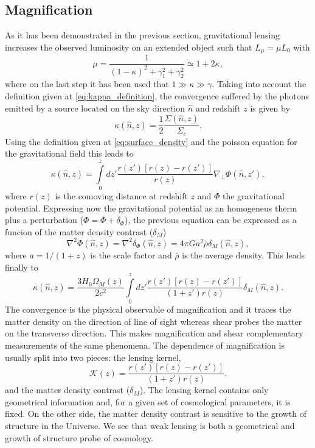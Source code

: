 \subsection{Magnification}
As it has been demonstrated in the previous section, gravitational lensing increases the observed luminosity on an extended object \cite{1989Sci...245..824B,1992RvMA....5..259B,1992LNP...406..345B,1995A&A...303..643B,1995AIPC..336..307B} such that $L_\mu = \mu L_0$ with 
\begin{equation}
\mu = \frac1{(1-\kappa)^2+\gamma_1^2+\gamma_2^2}\simeq 1+2\kappa,
\label{eq:mu_definition}
\end{equation}
where on the last step it has been used that $1\gg\kappa\gg\gamma$. Taking into account the definition given at \autoref{eq:kappa_definition}, the convergence suffered by the photons emitted by a source located on the sky direction $\hat n$ and redshift $z$ is given by
\begin{equation}
\kappa(\hat n,z) = \frac{1}{2}\frac{\Sigma(\hat n,z)}{\Sigma_c}.
\end{equation}
Using the definition given at \autoref{eq:surface_density} and the poisson equation for the gravitational field this leads to
\begin{equation}
\kappa(\hat n,z) = \int\limits_0^zdz'\frac{r(z')[r(z)-r(z')]}{r(z)}\nabla_\perp\Phi(\hat n,z'),
\label{eq:kappaphi}
\end{equation}
where $r(z)$ is the comoving distance at redshift $z$ and $\Phi$ the gravitational potential. Expressing now the gravitational potential as an homogeneus therm plus a perturbation ($\Phi = \bar\Phi+\delta_\Phi$), the previous equation can be expressed as a funcion of the matter density contrast ($\delta_M$)
\begin{equation}
\nabla^2\Phi(\hat n,z) = \nabla^2\delta_\Phi(\hat n,z) = 4\pi Ga^2\bar\rho\delta_M(\hat n,z),
\label{eq:kappadeltam}
\end{equation}
where $a=1/(1+z)$ is the scale factor and $\bar\rho$ is the average density. This leads finally to \cite{PhysRevD.76.103502,PhysRevD.77.063526}
\begin{equation}
\kappa(\hat n,z) = \frac{3H_0\Omega_M(z)}{2c^2}\int\limits_0^zdz'\frac{r(z')[r(z)-r(z')]}{(1+z')r(z)}\delta_M(\hat n,z).
\label{eq:kappadeltam}
\end{equation}
The convergence is the physical observable of magnification and it traces the matter density on the direction of line of sight whereas shear probes the matter on the transverse direction. This makes magnification and shear complementary measurements of the same phenomena. The dependence of magnification is usually split into two pieces: the lensing kernel,
\begin{equation}
\mathcal{K}(z) = \frac{r(z')[r(z)-r(z')]}{(1+z')r(z)}.
\end{equation}
and the matter density contrast ($\delta_M$). The lensing kernel contains only geometrical information and, for a given set of cosmological parameters, it is fixed. On the other side, the matter density contrast is sensitive to the growth of structure in the Universe. We see that weak lensing is both a geometrical and growth of structure probe of cosmology.
\newline

